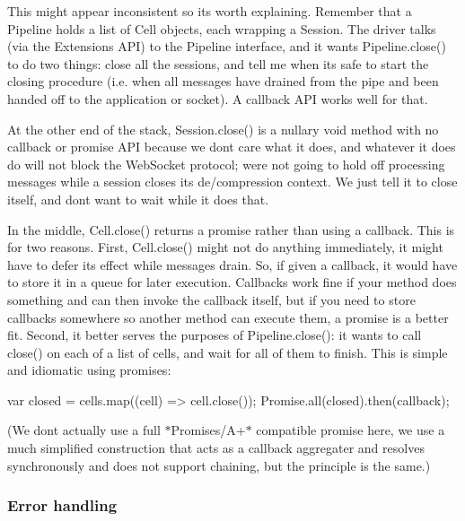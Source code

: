 This might appear inconsistent so it\textquotesingle{}s worth explaining. Remember that a {\ttfamily Pipeline} holds a list of {\ttfamily Cell} objects, each wrapping a {\ttfamily Session}. The driver talks (via the {\ttfamily Extensions} A\+PI) to the {\ttfamily Pipeline} interface, and it wants {\ttfamily Pipeline.\+close()} to do two things\+: close all the sessions, and tell me when it\textquotesingle{}s safe to start the closing procedure (i.\+e. when all messages have drained from the pipe and been handed off to the application or socket). A callback A\+PI works well for that.

At the other end of the stack, {\ttfamily Session.\+close()} is a nullary void method with no callback or promise A\+PI because we don\textquotesingle{}t care what it does, and whatever it does do will not block the Web\+Socket protocol; we\textquotesingle{}re not going to hold off processing messages while a session closes its de/compression context. We just tell it to close itself, and don\textquotesingle{}t want to wait while it does that.

In the middle, {\ttfamily Cell.\+close()} returns a promise rather than using a callback. This is for two reasons. First, {\ttfamily Cell.\+close()} might not do anything immediately, it might have to defer its effect while messages drain. So, if given a callback, it would have to store it in a queue for later execution. Callbacks work fine if your method does something and can then invoke the callback itself, but if you need to store callbacks somewhere so another method can execute them, a promise is a better fit. Second, it better serves the purposes of {\ttfamily Pipeline.\+close()}\+: it wants to call {\ttfamily close()} on each of a list of cells, and wait for all of them to finish. This is simple and idiomatic using promises\+:


\begin{DoxyCode}
var closed = cells.map((cell) => cell.close());
Promise.all(closed).then(callback);
\end{DoxyCode}


(We don\textquotesingle{}t actually use a full $\ast$\+Promises/\+A+$\ast$ compatible promise here, we use a much simplified construction that acts as a callback aggregater and resolves synchronously and does not support chaining, but the principle is the same.)

\subsubsection*{Error handling}

